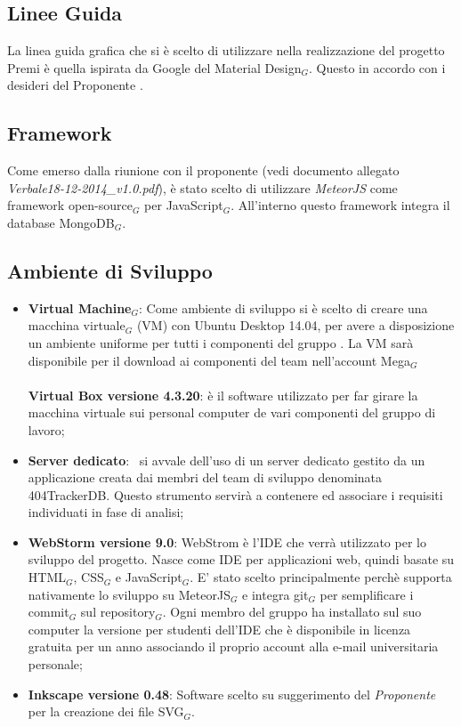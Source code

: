\subsection{Linee Guida}
La linea guida grafica che si è scelto di utilizzare nella realizzazione del progetto Premi è quella ispirata da Google del Material Design$_G$. Questo in accordo con i desideri del Proponente \Zucchetti.
\subsection{Framework}
Come emerso dalla riunione con il proponente (vedi documento allegato \textit{Verbale18-12-2014\_v1.0.pdf}), è stato scelto di utilizzare \textit{MeteorJS} come framework open-source$_G$ per JavaScript$_G$. All'interno questo framework integra il database MongoDB$_G$.

\subsection{Ambiente di Sviluppo}

\begin{itemize}
	\item \textbf{Virtual Machine$_G$}:
	\smallbreak
	Come ambiente di sviluppo si è scelto di creare una macchina virtuale$_G$ (VM) con Ubuntu Desktop 14.04, per avere a disposizione un ambiente uniforme per tutti i componenti del gruppo \gruppo. La VM sarà disponibile per il download ai componenti del team nell'account Mega$_G$
	\\ \\
	\textbf{Virtual Box versione 4.3.20}: è il software utilizzato per far girare la macchina virtuale sui personal computer de vari componenti del gruppo di lavoro;
	\item \textbf{Server dedicato}:
	\gruppo\ si avvale dell'uso di un server dedicato gestito da un applicazione creata dai membri del team di sviluppo denominata 404TrackerDB. Questo strumento servirà a contenere ed associare i requisiti individuati in fase di analisi;
    \item \textbf{WebStorm versione 9.0}: WebStrom è l'IDE che verrà utilizzato per lo sviluppo del progetto. Nasce come IDE per applicazioni web, quindi basate su HTML$_G$, CSS$_G$ e JavaScript$_G$. E' stato scelto principalmente perchè supporta nativamente lo sviluppo su MeteorJS$_G$ e integra git$_G$ per semplificare i commit$_G$ sul repository$_G$. Ogni membro del gruppo ha installato sul suo computer la versione per studenti dell'IDE che è disponibile in licenza gratuita per un anno associando il proprio account alla e-mail universitaria personale;
    
    \item \textbf{Inkscape versione 0.48}: Software scelto su suggerimento del \textit{Proponente} per la creazione dei file SVG$_G$.
\end{itemize}

